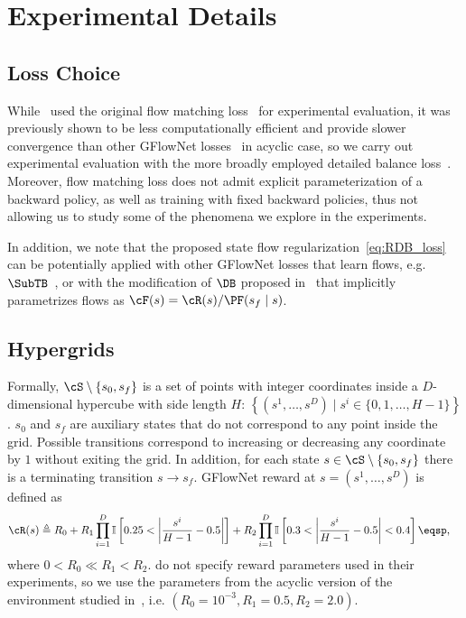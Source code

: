 \section{Experimental Details}\label{app:exp_details}

\subsection{Loss Choice}\label{app:loss_choice}

While~\cite{brunswic2024theory} used the original flow matching loss~\cite{bengio2021flow} for experimental evaluation, it was previously shown to be less computationally efficient and provide slower convergence than other GFlowNet losses~\cite{malkin2022gflownets, madan2023learning} in acyclic case, so we carry out experimental evaluation with the more broadly employed detailed balance loss~\cite{bengio2023gflownet}. Moreover, flow matching loss does not admit explicit parameterization of a backward policy, as well as training with fixed backward policies, thus not allowing us to study some of the phenomena we explore in the experiments. 

In addition, we note that the proposed state flow regularization~\eqref{eq:RDB_loss} can be potentially applied with other GFlowNet losses that learn flows, e.g. $\SubTB$~\cite{madan2023learning}, or with the modification of $\DB$ proposed in~\cite{deleu2022bayesian} that implicitly parametrizes flows as $\cF(s) = \cR(s) / \PF(s_f \mid s)$.

\subsection{Hypergrids}\label{app:exp_grids}

Formally, $\cS \setminus \{s_0, s_f\}$ is a set of points with integer coordinates inside a $D$-dimensional hypercube with side length $H$: $\left\{\left(s^1, \ldots, s^D\right) \mid s^i \in\{0,1, \ldots, H-1\}\right\}$. $s_0$ and $s_f$ are auxiliary states that do not correspond to any point inside the grid. Possible transitions correspond to increasing or decreasing any coordinate by $1$ without exiting the grid. In addition, for each state $s \in \cS \setminus \{s_0, s_f\}$ there is a terminating transition $s \to s_f$. GFlowNet reward at $s = (s^1, \ldots, s^D)$ is defined as
\begin{align*}
\cR(s) \triangleq R_0 &+ R_1 \prod_{i = 1}^D \mathbb{I}\left[0.25 < \left|\frac{s^i}{H-1}-0.5\right|\right] + R_2 \prod_{i = 1}^D \mathbb{I}\left[0.3 < \left|\frac{s^i}{H-1}-0.5\right| < 0.4\right]\eqsp,
\end{align*}
where $0<R_0 \ll R_1<R_2$. \cite{brunswic2024theory} do not specify reward parameters used in their experiments, so we use the parameters from the acyclic version of the environment studied in~\cite{malkin2022trajectory}, i.e. $(R_0 = 10^{-3}, R_1 = 0.5, R_2 = 2.0)$. 

